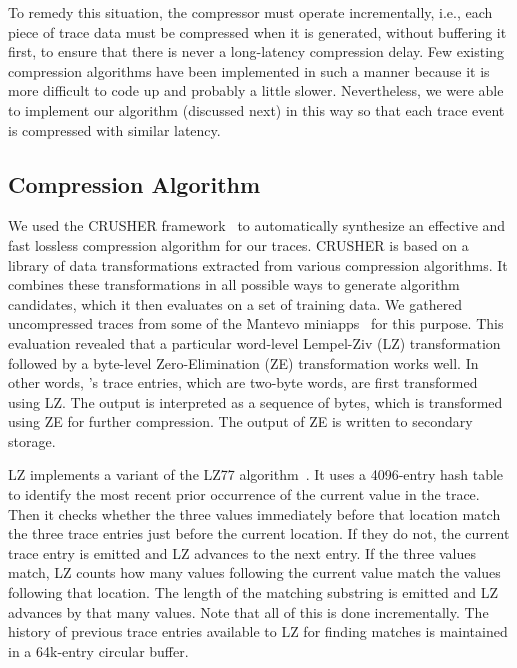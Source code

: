 To remedy this situation, the compressor must operate incrementally, i.e., each piece of trace data must be compressed when it is generated, without buffering it first, to ensure that there is never a long-latency compression delay. Few existing compression algorithms have been implemented in such a manner because it is more difficult to code up and probably a little slower. Nevertheless, we were able to implement our algorithm (discussed next) in this way so that each trace event is compressed with similar latency.


\subsection{Compression Algorithm}
\label{subsec:compAlg}

We used the CRUSHER framework~\cite{mb-cluster15, mb-space16, mb-sc16, mb-dcc18} to automatically synthesize an effective and fast lossless compression algorithm for our traces. CRUSHER is based on a library of data transformations extracted from various compression algorithms. It combines these transformations in all possible ways to generate algorithm candidates, which it then evaluates on a set of training data. We gathered uncompressed traces from some of the Mantevo miniapps~\cite{mantevo} for this purpose. This evaluation revealed that a particular word-level Lempel-Ziv (LZ) transformation followed by a byte-level Zero-Elimination (ZE) transformation works well. In other words, \parlot 's trace entries, which are two-byte words, are first transformed using LZ. The output is interpreted as a sequence of bytes, which is transformed using ZE for further compression. The output of ZE is written to secondary storage.

LZ implements a variant of the LZ77 algorithm~\cite{LZ}. It uses a 4096-entry hash table to identify the most recent prior occurrence of the current value in the trace. Then it checks whether the three values immediately before that location match the three trace entries just before the current location. If they do not, the current trace entry is emitted and LZ advances to the next entry. If the three values match, LZ counts how many values following the current value match the values following that location. The length of the matching substring is emitted and LZ advances by that many values. Note that all of this is done incrementally. The history of previous trace entries available to LZ for finding matches is maintained in a 64k-entry circular buffer.

